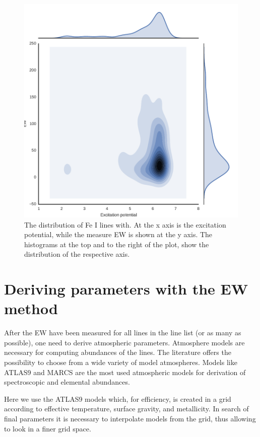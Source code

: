 \documentclass{aa}
\begin{document}
\begin{figure}[htpb]
    \centering
    \includegraphics[width=0.9\linewidth]{figures/EWvsEP_cut.pdf}
    \caption{The distribution of Fe I lines with. At the x axis is the
    excitation potential, while the measure EW is shown at the y axis.
    The histograms at the top and to the right of the plot, show the
    distribution of the respective axis.}
    \label{fig:Fe1_after_recal}
\end{figure}



\section{Deriving parameters with the EW method}
\label{sec:deriving_parameters_with_the_ew_method}

After the EW have been measured for all lines in the line list (or as many as
possible), one need to derive atmospheric parameters. Atmosphere models are
necessary for computing abundances of the lines. The literature offers the
possibility to choose from a wide variety of model atmospheres. Models like
ATLAS9 \citep{kurucz1993} and MARCS \citep{gustafson2008} are the most used
atmospheric models for derivation of spectroscopic and elemental abundances.

Here we use the ATLAS9 models which, for efficiency, is created
in a grid according to effective temperature, surface gravity,
and metallicity. In search of final parameters it is necessary to
interpolate models from the grid, thus allowing to look in a finer grid
space.
\end{document}
